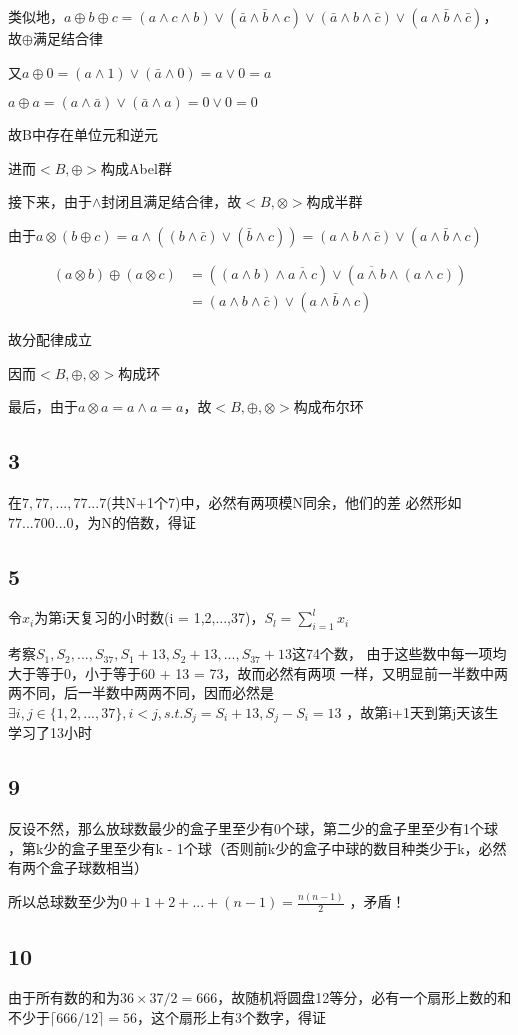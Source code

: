 \documentclass[UTF8]{ctexart}
\begin{document}
类似地，$a\oplus b\oplus c = (a\land c\land b)\lor (\bar a\land \bar b\land c)\lor (\bar a\land b\land \bar c)\lor (a\land \bar b\land \bar c)$，
故$\oplus$满足结合律

又$a\oplus 0 = (a\land 1)\lor (\bar a\land 0) = a\lor 0 = a$

$a\oplus a = (a\land \bar a)\lor (\bar a\land a) = 0\lor 0 = 0$

故B中存在单位元和逆元

进而$<B, \oplus >$构成Abel群

接下来，由于$\land$封闭且满足结合律，故$<B, \otimes>$构成半群

由于$a\otimes(b\oplus c) = a\land ((b\land \bar c)\lor (\bar b \land c)) = (a\land b\land \bar c)\lor (a\land \bar b\land c)$

\[
\begin{aligned}
    (a\otimes b)\oplus (a\otimes c) &= ((a\land b)\land \overline{a\land c}) \lor (\overline{a\land b} \land (a\land c))\\
    &= (a\land b\land \bar c)\lor (a\land \bar b\land c)
\end{aligned}
\]

故分配律成立

因而$<B, \oplus, \otimes>$构成环

最后，由于$a\otimes a = a\land a = a$，故$<B, \oplus, \otimes>$构成布尔环

\subsection*{3}

在$7, 77, ..., 77...7$(共N+1个7)中，必然有两项模N同余，他们的差
必然形如$77...700...0$，为N的倍数，得证

\subsection*{5}

令$x_i$为第i天复习的小时数(i = 1,2,...,37)，$S_l = \sum\limits_{i = 1}^lx_i$

考察$S_1, S_2, ..., S_37, S_1 + 13, S_2 + 13, ..., S_37 + 13$这74个数，
由于这些数中每一项均大于等于0，小于等于60 + 13 = 73，故而必然有两项
一样，又明显前一半数中两两不同，后一半数中两两不同，因而必然是$\exists
i, j\in\{1, 2, ..., 37\}, i < j, s.t. S_j = S_i + 13, S_j - S_i = 13$
，故第i+1天到第j天该生学习了13小时

\subsection*{9}

反设不然，那么放球数最少的盒子里至少有0个球，第二少的盒子里至少有1个球
，第k少的盒子里至少有k - 1个球（否则前k少的盒子中球的数目种类少于k，必然
有两个盒子球数相当）

所以总球数至少为$0 + 1 + 2 + ... + (n - 1) = \frac{n(n-1)}{2}$
，矛盾！

\subsection*{10}

由于所有数的和为$36\times 37 / 2 = 666$，故随机将圆盘12等分，必有一个扇形上数的和不少于$\lceil 666 / 12\rceil = 56$，这个扇形上有3个数字，得证
\end{document}
